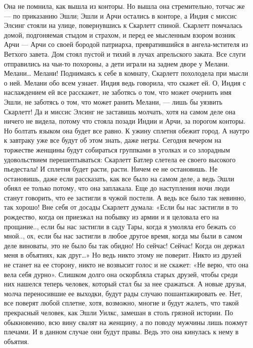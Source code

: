 Она не помнила, как вышла из конторы. Но вышла она стремительно, тотчас же — по приказанию Эшли; Эшли и Арчи остались в конторе, а Индия с миссис Элсинг стояли на улице, повернувшись к Скарлетт спиной. Скарлетт помчалась домой, подгоняемая стыдом и страхом, и перед ее мысленным взором возник Арчи — Арчи со своей бородой патриарха, превратившийся в ангела-мстителя из Ветхого завета.
Дом стоял пустой и тихий в лучах апрельского заката. Все слуги отправились на чьи-то похороны, а дети играли на заднем дворе у Мелани. Мелани…
Мелани! Поднимаясь к себе в комнату, Скарлетт похолодела при мысли о ней. Мелани обо всем узнает. Индия ведь говорила, что скажет ей. О, Индия с наслаждением ей все расскажет, не заботясь о том, что может очернить имя Эшли, не заботясь о том, что может ранить Мелани, — лишь бы уязвить Скарлетт! Да и миссис Элсинг не заставишь молчать, хотя на самом деле она ничего не видела, потому что стояла позади Индии и Арчи, за порогом конторы. Но болтать языком она будет все равно. К ужину сплетня обежит город. А наутро к завтраку уже все будут об этом знать, даже негры. Сегодня вечером на торжестве женщины будут собираться группками в уголках и со злорадным удовольствием перешептываться: Скарлетт Батлер слетела ее своего высокого пьедестала! И сплетня будет расти, расти. Ничем ее не остановишь. Не остановишь, даже если рассказать, как все было на самом деле, а ведь Эшли обнял ее только потому, что она заплакала. Еще до наступления ночи люди станут говорить, что ее застигли в чужой постели. А ведь все было так невинно, так хорошо! Вне себя от досады Скарлетт думала: «Если бы нас застигли в то рождество, когда он приезжал на побывку из армии и я целовала его на прощание.., если бы нас застигли в саду Тары, когда я умоляла его бежать со мной.., ох, если бы нас застигли в любое другое время, когда мы были в самом деле виноваты, это не было бы так обидно! Но сейчас! Сейчас! Когда он держал меня в объятиях, как друг…» Но ведь никто этому не поверит. Никто из друзей не станет на ее сторону, никто не возвысит голос и не скажет: «Не верю, что она вела себя дурно». Слишком долго она оскорбляла старых друзей, чтобы среди них нашелся теперь человек, который стал бы за нее сражаться. А новые друзья, молча переносившие ее выходки, будут рады случаю пошантажировать ее. Нет, все поверят любой сплетне, хотя, возможно, многие и будут жалеть, что такой прекрасный человек, как Эшли Уилкс, замешан в столь грязной истории. По обыкновению, всю вину свалят на женщину, а по поводу мужчины лишь пожмут плечами. И в данном случае они будут правы. Ведь это она кинулась к нему в объятия.
